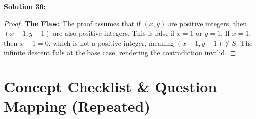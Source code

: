 \documentclass[11pt]{article}
\theoremstyle{definition}
\begin{document}
\textbf{Solution 30:}
\begin{proof}
\textbf{The Flaw:} The proof assumes that if $(x, y)$ are positive integers, then $(x - 1, y - 1)$ are also positive integers. This is false if $x = 1$ or $y = 1$. If $x = 1$, then $x - 1 = 0$, which is not a positive integer, meaning $(x - 1, y - 1) \notin S$. The infinite descent fails at the base case, rendering the contradiction invalid.
\end{proof}

\newpage

\section{Concept Checklist \& Question Mapping (Repeated)}
\label{sec:checklist_end}
\end{document}
